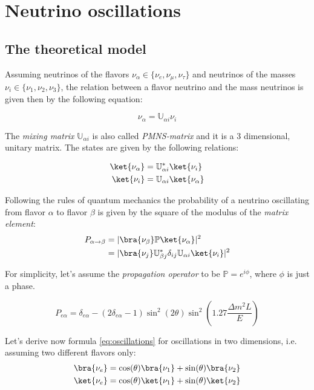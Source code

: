 \chapter{Neutrino oscillations}

\section{The theoretical model}
\cite{Wang:2015rma}
Assuming neutrinos of the flavors $\nu_\alpha \in \{\nu_e, \nu_\mu, \nu_\tau\}$ and neutrinos of the masses $\nu_i \in \{\nu_1, \nu_2, \nu_3\}$, the relation between a flavor neutrino and the mass neutrinos is given then by the following equation:

\begin{equation}
    \nu_\alpha = \mathbb{U}_{\alpha i} \nu_i
\end{equation}

The \emph{mixing matrix} $\mathbb{U}_{\alpha i}$ is also called \emph{PMNS-matrix} and it is a 3 dimensional, unitary matrix.
The states are given by the following relations:

\begin{align}
    \ket{\nu_\alpha} &= \mathbb{U}^*_{\alpha i} \ket{\nu_i} \\
    \ket{\nu_i}      &= \mathbb{U}_{\alpha i} \ket{\nu_\alpha}
\end{align}

Following the rules of quantum mechanics the probability of a neutrino oscillating from flavor $\alpha$ to flavor $\beta$ is given by the square of the modulus of the \emph{matrix element}:
\begin{align}
	P_{\alpha \to \beta}	&= |\bra{\nu_\beta} \mathbb{P} \ket{\nu_\alpha}|^2 \\
	&= |\bra{\nu_j} \mathbb{U}^*_{\beta j} \delta_{i j} \mathbb{U}_{\alpha i} \ket{\nu_i}|^2
\end{align}

For simplicity, let's assume the \emph{propagation operator} to be $\mathbb{P} = e^{i \phi}$, where $\phi$ is just a phase.


\begin{equation}
    P_{e\alpha} = \delta_{e\alpha} - (2\delta_{e\alpha} - 1) \sin^2 (2\theta) \sin^2 (1.27 \frac{\Delta m^2 L}{E})
    \label{eq:oscillations}
\end{equation}

Let's derive now formula \ref{eq:oscillations} for oscillations in two dimensions, i.e. assuming two different flavors only:
\begin{align}
    \nonumber
    \bra{\nu_e} &= \cos(\theta)\bra{\nu_1} + \sin(\theta)\bra{\nu_2}\\
    \nonumber
    \ket{\nu_e} &= \cos(\theta)\ket{\nu_1} + \sin(\theta)\ket{\nu_2}
\end{align}

